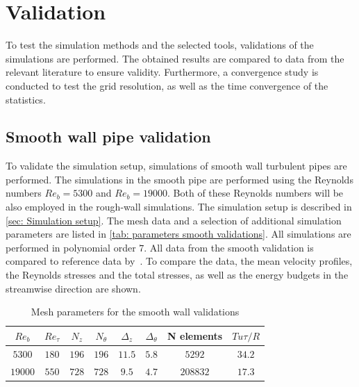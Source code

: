 \chapter{Validation} \label{chap: Validation}
To test the simulation methods and the selected tools, validations of the simulations are performed.
The obtained results are compared to data from the relevant literature to ensure validity.
Furthermore, a convergence study is conducted to test the grid resolution, as well as the time convergence of the statistics.
 
\section{Smooth wall pipe validation}\label{sec: Smooth wall pipe}
To validate the simulation setup, simulations of smooth wall turbulent pipes are performed.
The simulations in the smooth pipe are performed using the Reynolds numbers $Re_b = 5300$ and $Re_b = 19000$.
Both of these Reynolds numbers will be also employed in the rough-wall simulations.
The simulation setup is described in \autoref{sec: Simulation setup}.
The mesh data and a selection of additional simulation parameters are listed in \autoref{tab: parameters smooth validations}.
All simulations are performed in polynomial order $7$.
All data from the smooth validation is compared to reference data by~\cite{yaoDirectNumericalSimulations2023}.
To compare the data, the mean velocity profiles, the Reynolds stresses and the total stresses, as well as the energy budgets in the streamwise direction are shown.
\begin{table}[h]
    \centering
    \caption{Mesh parameters for the smooth wall validations}
    \begin{tabular}{c c c c c c c c}
        \toprule
        $Re_b$  & $Re_\tau$ & $N_z$ & $N_\theta$ & $\Delta_z$    & $\Delta_\theta$  & N elements    & $Tu\tau / R$\\
        \midrule
        $5300$  & $180$     & $196$ & $196$     & $11.5$        & $5.8$             & $5292$        & $34.2$\\
        $19000$ & $550$     & $728$ & $728$     & $9.5$         & $4.7$             & $208832$      & $17.3$\\
        \bottomrule
    \end{tabular}
    \label{tab: parameters smooth validations}
\end{table}

